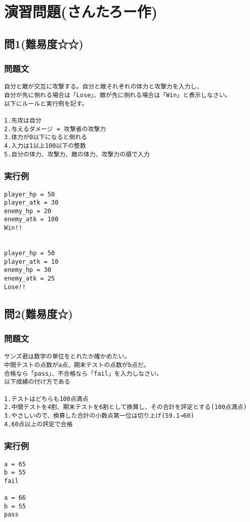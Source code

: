 \section{演習問題(さんたろー作)}
\subsection{問1(難易度☆☆)}
\subsubsection{問題文}
\begin{verbatim}
自分と敵が交互に攻撃する。自分と敵それぞれの体力と攻撃力を入力し、
自分が先に倒れる場合は「Lose」、敵が先に倒れる場合は「Win」と表示しなさい。
以下にルールと実行例を記す。

1.先攻は自分
2.与えるダメージ = 攻撃者の攻撃力
3.体力が0以下になると倒れる
4.入力は1以上100以下の整数
5.自分の体力、攻撃力、敵の体力、攻撃力の順で入力
\end{verbatim}

\subsubsection{実行例}
\begin{verbatim}
player_hp = 50
player_atk = 30
enemy_hp = 20
enemy_atk = 100
Win!!


player_hp = 50
player_atk = 10
enemy_hp = 30
enemy_atk = 25
Lose!!
\end{verbatim}

\subsection{問2(難易度☆)}
\subsubsection{問題文}
\begin{verbatim}
サンズ君は数学の単位をとれたか確かめたい。
中間テストの点数がa点、期末テストの点数がb点だ。
合格なら「pass」、不合格なら「fail」を入力しなさい。
以下成績の付け方である

1.テストはどちらも100点満点
2.中間テストを4割、期末テストを6割として換算し、その合計を評定とする(100点満点)
3.やさしいので、換算した合計の小数点第一位は切り上げ(59.1→60)
4.60点以上の評定で合格

\end{verbatim}

\subsubsection{実行例}
\begin{verbatim}
a = 65
b = 55
fail

a = 66
b = 55
pass
\end{verbatim}


